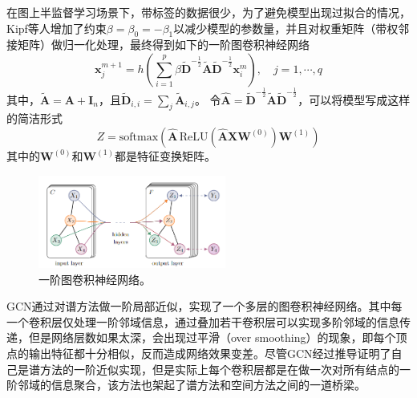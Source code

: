 \documentclass[final]{cvpr}
\begin{document}
在图上半监督学习场景下，带标签的数据很少，为了避免模型出现过拟合的情况，Kipf等人增加了约束$\beta=\beta_0=-\beta_1$以减少模型的参数量，并且对权重矩阵（带权邻接矩阵）做归一化处理，最终得到如下的一阶图卷积神经网络
\begin{equation}  \label{equ:gcn-forward-norm}
    \boldsymbol{x}_j^{m+1}
    = 
    h \left(
        \sum_{i=1}^{p}
        \beta
        \widetilde{\boldsymbol{D}}^{-\frac{1}{2}}
        \widetilde{\boldsymbol{A}}
        \widetilde{\boldsymbol{D}}^{-\frac{1}{2}}
        \boldsymbol{x}_i^{m}
    \right)
    ,\quad j=1,\cdots,q
\end{equation}
其中，$\widetilde{\boldsymbol{A}}=\boldsymbol{A}+\boldsymbol{I}_n$，且$\widetilde{\boldsymbol{D}}_{i,i}=\sum_j \widetilde{\boldsymbol{A}}_{i,j}$。
令$\hat{\boldsymbol{A}}=\widetilde{\boldsymbol{D}}^{-\frac{1}{2}}
        \widetilde{\boldsymbol{A}}
        \widetilde{\boldsymbol{D}}^{-\frac{1}{2}}$，可以将模型写成这样的简洁形式
\begin{equation}  \label{equ:gcn-concise}
    Z = \mathrm{softmax} \left(
        \hat{\boldsymbol{A}} \,
        \mathrm{ReLU} \left(\hat{\boldsymbol{A}}
        \boldsymbol{X}
        \boldsymbol{W}^{(0)}
    \right) \boldsymbol{W}^{(1)} \right)
\end{equation}
其中的$\boldsymbol{W}^{(0)}$和$\boldsymbol{W}^{(1)}$都是特征变换矩阵。
\begin{figure}[htb!]
    \centering
    \includegraphics[width=0.55\textwidth]{gcn.png}
    \caption{一阶图卷积神经网络。}
    \label{fig:gcn}
\end{figure}

GCN通过对谱方法做一阶局部近似，实现了一个多层的图卷积神经网络。其中每一个卷积层仅处理一阶邻域信息，通过叠加若干卷积层可以实现多阶邻域的信息传递，但是网络层数如果太深，会出现过平滑（over smoothing）的现象，即每个顶点的输出特征都十分相似，反而造成网络效果变差。尽管GCN经过推导证明了自己是谱方法的一阶近似实现，但是实际上每个卷积层都是在做一次对所有结点的一阶邻域的信息聚合，该方法也架起了谱方法和空间方法之间的一道桥梁。
\end{document}
